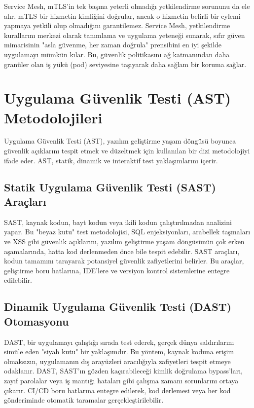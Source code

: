 Service Mesh, mTLS'in tek başına yeterli olmadığı yetkilendirme sorununu da ele alır. mTLS bir hizmetin kimliğini doğrular, ancak o hizmetin belirli bir eylemi yapmaya yetkili olup olmadığını garantilemez. Service Mesh, yetkilendirme kurallarını merkezi olarak tanımlama ve uygulama yeteneği sunarak, sıfır güven mimarisinin "asla güvenme, her zaman doğrula" prensibini en iyi şekilde uygulamayı mümkün kılar. Bu, güvenlik politikasını ağ katmanından daha granüler olan iş yükü (pod) seviyesine taşıyarak daha sağlam bir koruma sağlar.

\section{Uygulama Güvenlik Testi (AST) Metodolojileri}

Uygulama Güvenlik Testi (AST), yazılım geliştirme yaşam döngüsü boyunca güvenlik açıklarını tespit etmek ve düzeltmek için kullanılan bir dizi metodolojiyi ifade eder. AST, statik, dinamik ve interaktif test yaklaşımlarını içerir.

\subsection{Statik Uygulama Güvenlik Testi (SAST) Araçları}

SAST, kaynak kodun, bayt kodun veya ikili kodun çalıştırılmadan analizini yapar. Bu "beyaz kutu" test metodolojisi, SQL enjeksiyonları, arabellek taşmaları ve XSS gibi güvenlik açıklarını, yazılım geliştirme yaşam döngüsünün çok erken aşamalarında, hatta kod derlenmeden önce bile tespit edebilir. SAST araçları, kodun tamamını tarayarak potansiyel güvenlik zafiyetlerini belirler. Bu araçlar, geliştirme boru hatlarına, IDE'lere ve versiyon kontrol sistemlerine entegre edilebilir.

\subsection{Dinamik Uygulama Güvenlik Testi (DAST) Otomasyonu}

DAST, bir uygulamayı çalıştığı sırada test ederek, gerçek dünya saldırılarını simüle eden "siyah kutu" bir yaklaşımdır. Bu yöntem, kaynak koduna erişim olmaksızın, uygulamanın dış arayüzleri aracılığıyla zafiyetleri tespit etmeye odaklanır. DAST, SAST'ın gözden kaçırabileceği kimlik doğrulama bypass'ları, zayıf parolalar veya iş mantığı hataları gibi çalışma zamanı sorunlarını ortaya çıkarır. CI/CD boru hatlarına entegre edilerek, kod derlemesi veya her kod gönderiminde otomatik taramalar gerçekleştirilebilir.

